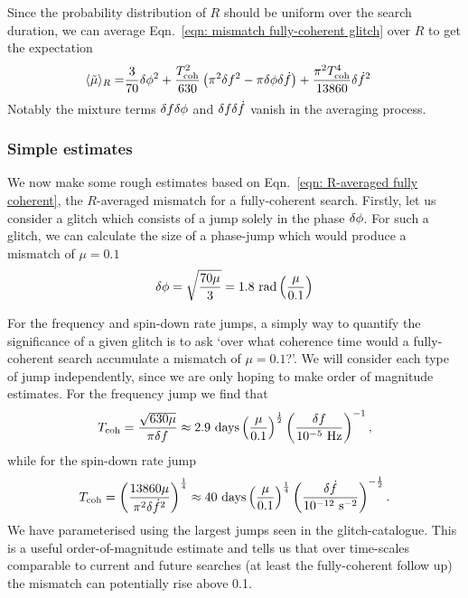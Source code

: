 \documentclass[../full_thesis/full_thesis.tex]{subfiles}
\begin{document}
Since the probability distribution of
$R$ should be uniform over the search duration, we can average Eqn.~\eqref{eqn:
mismatch fully-coherent glitch} over $R$ to get the expectation
\begin{align}
\langle \tilde{\mu} \rangle_{R} = &
\frac{3}{70}\delta\phi^{2}
+ \frac{T_{\mathrm{coh}}^{2}}{630}\left(\pi^{2}\delta f^{2}
- \pi\delta\phi\delta\dot{f}\right)
+ \frac{\pi^{2}T_{\mathrm{coh}}^{4}}{13860} \delta\dot{f}^{2}
\label{eqn: R-averaged fully coherent}
\end{align}
Notably the mixture terms $\delta f\delta\phi$ and
$\delta f\delta\dot{f}$ vanish in the averaging process.

\subsubsection{Simple estimates}

We now make some rough estimates based on Eqn.~\eqref{eqn: R-averaged
fully coherent}, the $R$-averaged mismatch for a fully-coherent search.
Firstly, let us consider a glitch which consists of a jump solely in the phase
$\delta\phi$. For such a glitch, we can calculate the size of a phase-jump
which would produce a mismatch of $\mu=0.1$
\begin{align}
\delta\phi =
\sqrt{\frac{70\mu}{3}} = 1.8 \textrm{ rad} \left(\frac{\mu}{0.1}\right)
\end{align}

For the frequency and spin-down rate jumps,
a simply way to quantify the significance of a given glitch is to ask `over
what coherence time would a fully-coherent search accumulate a mismatch of
$\mu=0.1$?'. We will consider each type of jump independently, since we are
only hoping to make order of magnitude estimates.
For the frequency jump we find that
\begin{align}
T_\textrm{coh} = \frac{\sqrt{630 \mu}}{\pi\delta f}
\approx 2.9 \textrm{ days} \left(\frac{\mu}{0.1}\right)^{\frac{1}{2}}
\left(\frac{\delta f}{10^{-5} \textrm{ Hz}}\right)^{-1},
\end{align}
while for the spin-down rate jump
\begin{align}
T_\textrm{coh} =
\left(\frac{13860 \mu}{\pi^{2}\delta\dot{f}^{2}}\right)^{\frac{1}{4}}
\approx 40 \textrm{ days} \left(\frac{\mu}{0.1}\right)^{\frac{1}{4}}
\left(\frac{\delta\dot{f}}{10^{-12} \textrm{ s}^{-2}}\right)^{-\frac{1}{2}}.
\end{align}
We have parameterised using the largest jumps seen in the
glitch-catalogue.  This is a useful order-of-magnitude estimate and tells us
that over time-scales comparable to current and future searches (at least the
fully-coherent follow up) the mismatch can potentially rise above 0.1.
\end{document}
